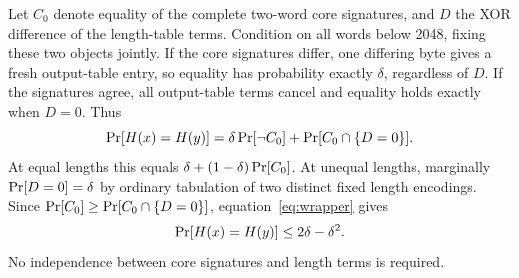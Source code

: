 Let $C_0$ denote equality of the complete two-word core signatures, and $D$ the XOR difference of the length-table terms. Condition on all words below 2048, fixing these two objects jointly. If the core signatures differ, one differing byte gives a fresh output-table entry, so equality has probability exactly $\delta$, regardless of $D$. If the signatures agree, all output-table terms cancel and equality holds exactly when $D=0$. Thus
\begin{equation}\label{eq:wrapper}
 \mathop{\rm Pr}[H(x)=H(y)]=\delta\mathop{\rm Pr}[\neg C_0]+\mathop{\rm Pr}[C_0\cap\{D=0\}].
\end{equation}
At equal lengths this equals $\delta+(1-\delta)\mathop{\rm Pr}[C_0]$. At unequal lengths, marginally $\mathop{\rm Pr}[D=0]=\delta$ by ordinary tabulation of two distinct fixed length encodings. Since $\mathop{\rm Pr}[C_0]\ge\mathop{\rm Pr}[C_0\cap\{D=0\}]$, equation~\eqref{eq:wrapper} gives
\begin{equation}\label{eq:unequal}
 \mathop{\rm Pr}[H(x)=H(y)]\le2\delta-\delta^2.
\end{equation}
No independence between core signatures and length terms is required.


